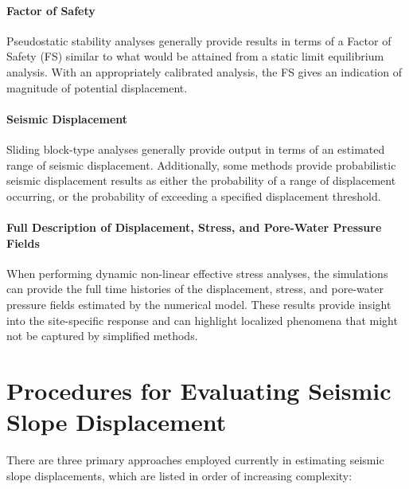\paragraph{Factor of Safety}
Pseudostatic stability analyses generally provide results in terms of a Factor of Safety (FS) similar to what would be attained from a static limit equilibrium analysis. With an appropriately calibrated analysis, the FS gives an indication of magnitude of potential displacement.

\paragraph{Seismic Displacement}
Sliding block-type analyses generally provide output in terms of an estimated range of seismic displacement. Additionally, some methods provide probabilistic seismic displacement results as either the probability of a range of displacement occurring, or the probability of exceeding a specified displacement threshold.

\paragraph{Full Description of Displacement, Stress, and Pore-Water Pressure Fields}
When performing dynamic non-linear effective stress analyses, the simulations can provide the full time histories of the displacement, stress, and pore-water pressure fields estimated by the numerical model. These results provide insight into the site-specific response and can highlight localized phenomena that might not be captured by simplified methods.

\section{Procedures for Evaluating Seismic Slope Displacement}
\label{sec:eq_landslide_methods}

There are three primary approaches employed currently in estimating seismic slope displacements, which are listed in order of increasing complexity:

